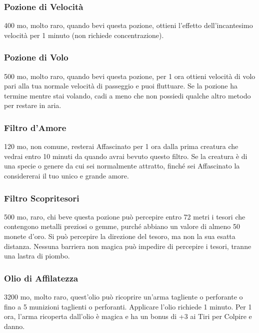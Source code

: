 \begin{multicols}{2}
	\subsubsection*{Pozione di Velocità}
	400 mo, molto raro, quando bevi questa pozione, ottieni l'effetto dell'incantesimo velocità per 1 minuto (non richiede concentrazione).

	\subsubsection*{Pozione di Volo}
	500 mo, molto raro, quando bevi questa pozione, per 1 ora ottieni velocità di volo pari alla tua normale velocità di passeggio e puoi fluttuare. Se la pozione ha termine mentre stai volando, cadi a meno che non possiedi qualche altro metodo per restare in aria.

	\subsubsection*{Filtro d'Amore}
	120 mo, non comune, resterai Affascinato per 1 ora dalla prima creatura che vedrai entro 10 minuti da quando avrai bevuto questo filtro. Se la creatura è di una specie o genere da cui sei normalmente attratto, finché sei Affascinato la considererai il tuo unico e grande amore.

	\subsubsection*{Filtro Scopritesori}
	500 mo, raro, chi beve questa pozione può percepire entro 72 metri i tesori che contengono metalli preziosi o gemme, purché abbiano un valore di almeno 50 monete d’oro. Si può percepire la direzione del tesoro, ma non la sua esatta distanza. Nessuna barriera non magica può impedire di percepire i tesori, tranne una lastra di piombo.

	\subsubsection*{Olio di Affilatezza}
	3200 mo, molto raro, quest'olio può ricoprire un'arma tagliente o perforante o fino a 5 munizioni taglienti o perforanti. Applicare l'olio richiede 1 minuto. Per 1 ora, l'arma ricoperta dall'olio è magica e ha un bonus di +3 ai Tiri per Colpire e danno.


\end{multicols}
